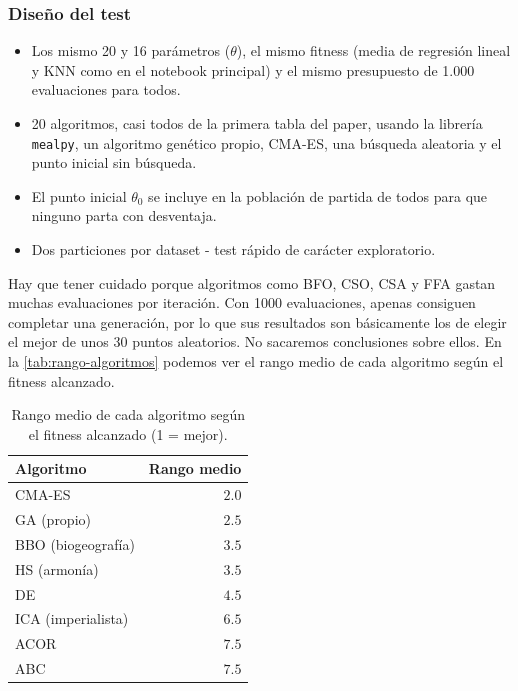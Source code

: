 \subsubsection{Diseño del test}
\begin{itemize}
    \item Los mismo 20 y 16 parámetros ($\theta$), el mismo fitness (media de regresión lineal y KNN como en el notebook principal) y el mismo presupuesto de 1.000 evaluaciones para todos. 
    \item 20 algoritmos, casi todos de la primera tabla del paper, usando la librería \texttt{mealpy}, un algoritmo genético propio, CMA-ES, una búsqueda aleatoria y el punto inicial sin búsqueda. 
    \item El punto inicial $\theta_0$ se incluye en la población de partida de todos para que ninguno parta con desventaja. 
    \item Dos particiones por dataset - test rápido de carácter exploratorio.
\end{itemize}

Hay que tener cuidado porque algoritmos como BFO, CSO, CSA y FFA gastan muchas evaluaciones por iteración. Con 1000 evaluaciones, apenas consiguen completar una generación, por lo que sus resultados son básicamente los de elegir el mejor de unos 30 puntos aleatorios. No sacaremos conclusiones sobre ellos. En la \autoref{tab:rango-algoritmos} podemos ver el rango medio de cada algoritmo según el fitness alcanzado. 

\begin{table}[h]
\centering
\begin{tabular}{lr}
\hline
\textbf{Algoritmo} & \textbf{Rango medio} \\
\hline
CMA-ES             & $2.0$ \\
GA (propio)        & $2.5$ \\
BBO (biogeografía) & $3.5$ \\
HS (armonía)       & $3.5$ \\
DE                 & $4.5$ \\
ICA (imperialista) & $6.5$ \\
ACOR               & $7.5$ \\
ABC                & $7.5$ \\
\hline
\end{tabular}
\caption{Rango medio de cada algoritmo según el fitness alcanzado (1 = mejor).}
\label{tab:rango-algoritmos}
\end{table}

